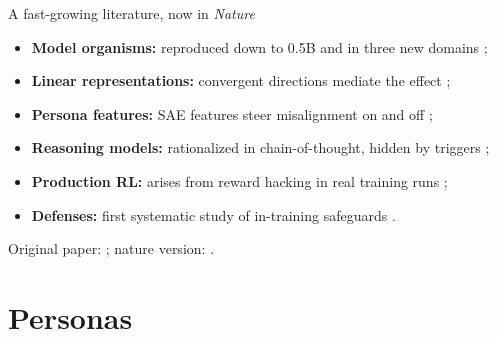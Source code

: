 \documentclass[aspectratio=169]{beamer}
\begin{document}
\begin{frame}{A fast-growing literature, now in \emph{Nature}}
  \vspace{1em}
  \begin{itemize}\setlength{\itemsep}{0.7em}
    \item \textbf{Model organisms:} reproduced down to 0.5B and in three new domains \cite{turner2025modelorganisms};
    \item \textbf{Linear representations:} convergent directions mediate the effect \cite{soligo2025convergent};
    \item \textbf{Persona features:} SAE features steer misalignment on and off \cite{wang2025persona};
    \item \textbf{Reasoning models:} rationalized in chain-of-thought, hidden by triggers \cite{chua2025thoughtcrime};
    \item \textbf{Production RL:} arises from reward hacking in real training runs \cite{macdiarmid2025natural};
    \item \textbf{Defenses:} first systematic study of in-training safeguards \cite{defenses2025intraining}.
  \end{itemize}
  \vspace{0.6em}
  \centering
  {\scriptsize\color{black!45} Original paper: \cite{betley2025emergent}; nature version: \cite{betley2026nature}.}
\end{frame}

\section{Personas}
\end{document}
